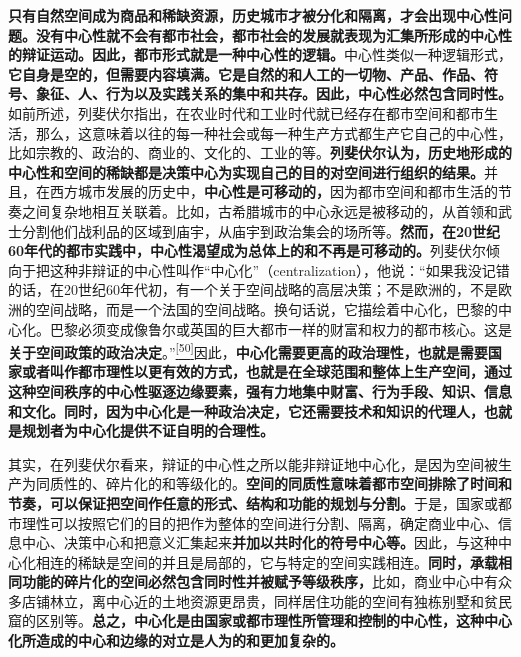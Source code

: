 \documentclass[UTF8, fontset = sourcesans, a4paper, oneside, zihao =
-4, scheme=chinese, no-math, space=true]{ctexbook}
\begin{document}
\textbf{只有自然空间成为商品和稀缺资源，历史城市才被分化和隔离，才会出现中心性问题。没有中心性就不会有都市社会，都市社会的发展就表现为汇集所形成的中心性的辩证运动。因此，都市形式就是一种中心性的逻辑。}中心性类似一种逻辑形式，\textbf{它自身是空的，但需要内容填满。它是自然的和人工的一切物、产品、作品、符号、象征、人、行为以及实践关系的集中和共存。因此，中心性必然包含同时性。}如前所述，列斐伏尔指出，在农业时代和工业时代就已经存在都市空间和都市生活，那么，这意味着以往的每一种社会或每一种生产方式都生产它自己的中心性，比如宗教的、政治的、商业的、文化的、工业的等。\textbf{列斐伏尔认为，历史地形成的中心性和空间的稀缺都是决策中心为实现自己的目的对空间进行组织的结果。}并且，在西方城市发展的历史中，\textbf{中心性是可移动的，}因为都市空间和都市生活的节奏之间复杂地相互关联着。比如，古希腊城市的中心永远是被移动的，从首领和武士分割他们战利品的区域到庙宇，从庙宇到政治集会的场所等。\textbf{然而，在20世纪60年代的都市实践中，中心性渴望成为总体上的和不再是可移动的。}列斐伏尔倾向于把这种非辩证的中心性叫作``中心化''（centralization），他说：``如果我没记错的话，在20世纪60年代初，有一个关于空间战略的高层决策；不是欧洲的，不是欧洲的空间战略，而是一个法国的空间战略。换句话说，它描绘着中心化，巴黎的中心化。巴黎必须变成像鲁尔或英国的巨大都市一样的财富和权力的都市核心。这是\textbf{关于空间政策的政治决定}。''\protect\hypertarget{part0007_split_003.htmlux5cux23w50}{}{}\protect\hyperlink{part0007_split_004.htmlux5cux23m50}{\textsuperscript{{[}50{]}}}因此，\textbf{中心化需要更高的政治理性，也就是需要国家或者叫作都市理性以更有效的方式，也就是在全球范围和整体上生产空间，通过这种空间秩序的中心性驱逐边缘要素，强有力地集中财富、行为手段、知识、信息和文化。同时，因为中心化是一种政治决定，它还需要技术和知识的代理人，也就是规划者为中心化提供不证自明的合理性。}

其实，在列斐伏尔看来，辩证的中心性之所以能非辩证地中心化，是因为空间被生产为同质性的、碎片化的和等级化的。\textbf{空间的同质性意味着都市空间排除了时间和节奏，可以保证把空间作任意的形式、结构和功能的规划与分割。}于是，国家或都市理性可以按照它们的目的把作为整体的空间进行分割、隔离，确定商业中心、信息中心、决策中心和把意义汇集起来\textbf{并加以共时化的符号中心等。}因此，与这种中心化相连的稀缺是空间的并且是局部的，它与特定的空间实践相连。\textbf{同时，承载相同功能的碎片化的空间必然包含同时性并被赋予等级秩序，}比如，商业中心中有众多店铺林立，离中心近的土地资源更昂贵，同样居住功能的空间有独栋别墅和贫民窟的区别等。\textbf{总之，中心化是由国家或都市理性所管理和控制的中心性，这种中心化所造成的中心和边缘的对立是人为的和更加复杂的。}
\end{document}

